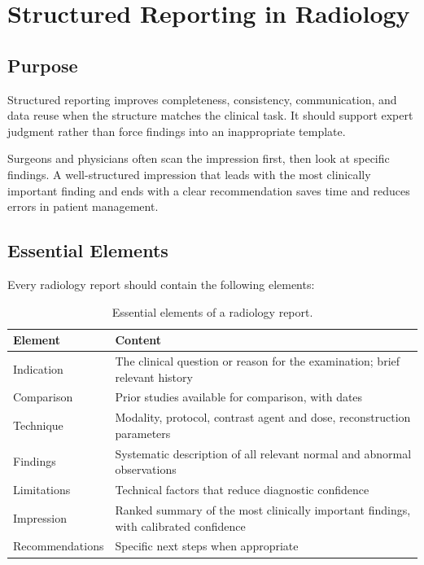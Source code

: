 \chapter{Structured Reporting in Radiology}

\label{ch:ch36_structured_reporting}

\section{Purpose}
Structured reporting improves completeness, consistency, communication, and data reuse when the structure matches the clinical task. It should support expert judgment rather than force findings into an inappropriate template.

\begin{pearlbox}
Surgeons and physicians often scan the impression first, then look at specific findings. A well-structured impression that leads with the most clinically important finding and ends with a clear recommendation saves time and reduces errors in patient management.
\end{pearlbox}

\section{Essential Elements}
Every radiology report should contain the following elements:

\begin{table}[h]
\centering
\caption{Essential elements of a radiology report.}
\label{tab:report_elements}
\begin{tabular}{p{3.5cm} p{10cm}}
\toprule
\textbf{Element} & \textbf{Content} \\
\midrule
Indication & The clinical question or reason for the examination; brief relevant history \\
Comparison & Prior studies available for comparison, with dates \\
Technique & Modality, protocol, contrast agent and dose, reconstruction parameters \\
Findings & Systematic description of all relevant normal and abnormal observations \\
Limitations & Technical factors that reduce diagnostic confidence \\
Impression & Ranked summary of the most clinically important findings, with calibrated confidence \\
Recommendations & Specific next steps when appropriate \\
\bottomrule
\end{tabular}
\end{table}

